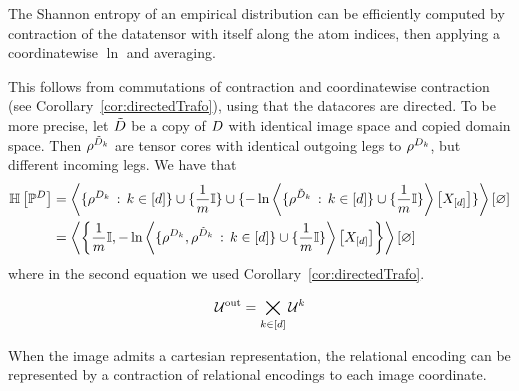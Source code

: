 \begin{example}
	The Shannon entropy of an empirical distribution can be efficiently computed by contraction of the datatensor with itself along the atom indices, then applying a coordinatewise $\ln$ and averaging.

	This follows from commutations of contraction and coordinatewise contraction (see Corollary~\ref{cor:directedTrafo}), using that the datacores are directed. 
	To be more precise, let $\tilde{D}$ be a copy of $D$ with identical image space and copied domain space.
	Then $\rho^{\tilde{D}_{k}}$ are tensor cores with identical outgoing legs to $\rho^{D_{k}}$, but different incoming legs.
	We have that
	\begin{align*}
		\mathbb{H}\left[\mathbb{P}^{D}\right] 
		& = \left\langle \{\rho^{D_{k}}\, : \, k\in[d]\} \cup \{\frac{1}{m}\mathbb{I} \} \cup \{-\ln \left\langle \{\rho^{\tilde{D}_{k}}\, : \, k\in[d]\} \cup \{\frac{1}{m}\mathbb{I} \}\right\rangle \left[ X_{[d]} \right] \} \right\rangle \left[ \varnothing \right] \\
		& = \left\langle 
		 \left\{\frac{1}{m}\mathbb{I}, -\ln \left\langle \{\rho^{D_{k}},\rho^{\tilde{D}_{k}}\, : \, k\in[d]\} \cup \{\frac{1}{m}\mathbb{I} \}\right\rangle \left[ X_{[d]} \right] \right\}
		\right\rangle \left[ \varnothing \right]
	\end{align*}
	where in the second equation we used Corollary~\ref{cor:directedTrafo}.
\end{example}


	\[ \mathcal{U}^{\mathrm{out}} = \bigtimes_{k\in[d]} \mathcal{U}^{k}\]


When the image admits a cartesian representation, the relational encoding can be represented by a contraction of relational encodings to each image coordinate.


